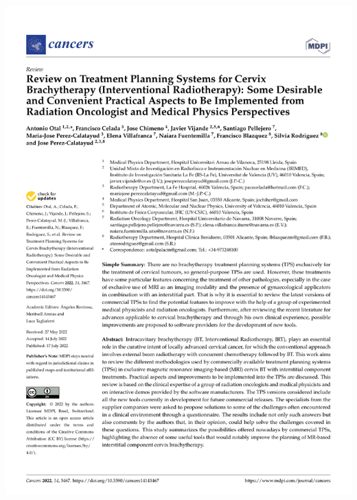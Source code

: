 \documentclass[
  a4paper,
]{scrreprt}
\begin{document}
\newpage{}

\includegraphics{articulos/cancers/cancers-01.png}
\end{document}
